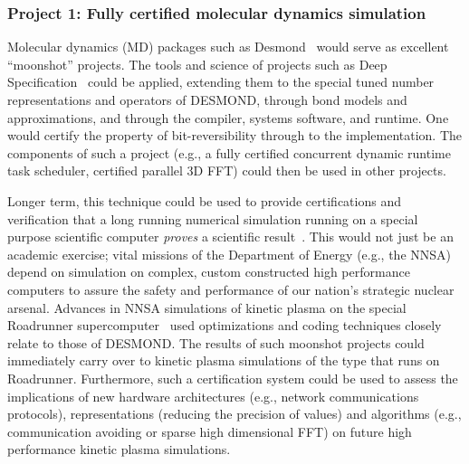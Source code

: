 \subsubsection{Project 1: Fully certified molecular dynamics simulation}  



Molecular dynamics (MD) packages such as Desmond~\cite{bowers2006scalable} would serve as excellent ``moonshot'' projects.  The tools and science of projects such as Deep Specification~\cite{Pierce:SPLASHTalk2016} could be applied, extending them to the special tuned number representations and operators of DESMOND, through bond models and approximations, and through the compiler, systems software, and runtime.  One would certify the property of bit-reversibility through to the implementation.  The components of such a project (e.g., a fully certified concurrent dynamic runtime task scheduler, certified parallel 3D FFT) could then be used in other projects. 

Longer term, this technique could be used to provide certifications and verification that a long running numerical simulation running on a special purpose scientific computer {\em proves} a scientific result~\cite{sussman1992chaotic}.  This would not just be an academic exercise; vital missions of the Department of Energy (e.g., the NNSA) depend on simulation on complex, custom constructed high performance computers to assure the safety and performance of our nation's strategic nuclear arsenal. Advances in NNSA simulations of kinetic plasma on the special Roadrunner supercomputer~\cite{bowers2009advances} used optimizations and coding techniques closely relate to those of DESMOND.  The results of such moonshot projects could immediately carry over to kinetic plasma simulations of the type that runs on Roadrunner.  Furthermore, such a certification system could be used to assess the implications of new hardware architectures (e.g., network communications protocols), representations (reducing the precision of values) and algorithms (e.g., communication avoiding or sparse high dimensional FFT) on future high performance kinetic plasma simulations.

